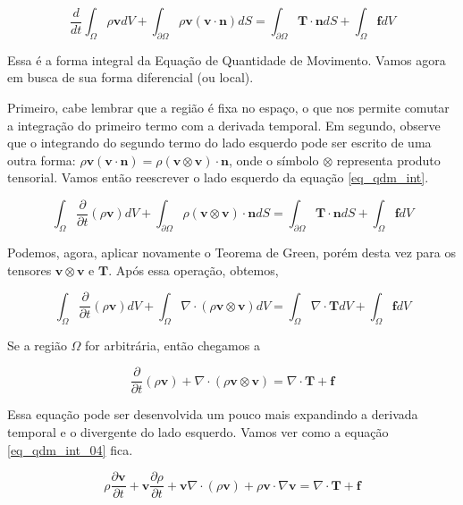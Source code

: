 \documentclass[a4paper,portuguese,10pt]{article}
\renewcommand{\div}{\nabla\cdot}
\newcommand{\grad}{\nabla}
\renewcommand{\D}{\partial}
\renewcommand{\vec}{\mathbf}
\begin{document}
\begin{equation}
  \frac{d}{dt}\int_{\Omega}\rho\vec{v}dV + \int_{\D\Omega}\rho\vec{v}(\vec{v}\cdot\vec{n})dS = \int_{\D\Omega}\vec{T}\cdot\vec{n}dS + \int_{\Omega}\vec{f}dV
  \label{eq_qdm_int}
\end{equation}

Essa é a forma integral da Equação de Quantidade de Movimento. Vamos agora em busca de sua forma diferencial (ou local).

Primeiro, cabe lembrar que a região é fixa no espaço, o que nos permite comutar a integração do primeiro termo com a derivada temporal. Em segundo, observe que o integrando do segundo termo do lado esquerdo pode ser escrito de uma outra forma: $\rho\vec{v}(\vec{v}\cdot\vec{n}) = \rho(\vec{v}\otimes\vec{v})\cdot\vec{n}$, onde o símbolo $\otimes$ representa produto tensorial. Vamos então reescrever o lado esquerdo da equação \ref{eq_qdm_int}.

\begin{equation}
  \int_{\Omega}\frac{\D}{\D t}(\rho\vec{v})dV + \int_{\D\Omega}\rho(\vec{v}\otimes\vec{v})\cdot\vec{n}dS = \int_{\D\Omega}\vec{T}\cdot\vec{n}dS + \int_{\Omega}\vec{f}dV
  \label{eq_qdm_int_02}
\end{equation}

Podemos, agora, aplicar novamente o Teorema de Green, porém desta vez para os tensores $\vec{v}\otimes\vec{v}$ e $\vec{T}$. Após essa operação, obtemos,

\begin{equation}
  \int_{\Omega}\frac{\D}{\D t}(\rho\vec{v})dV + \int_{\Omega}\div(\rho\vec{v}\otimes\vec{v})dV = \int_{\Omega}\div\vec{T}dV + \int_{\Omega}\vec{f}dV
  \label{eq_qdm_int_03}
\end{equation}

Se a região $\Omega$ for arbitrária, então chegamos a

\begin{equation}
  \frac{\D}{\D t}(\rho\vec{v}) + \div(\rho\vec{v}\otimes\vec{v}) = \div\vec{T} + \vec{f}
  \label{eq_qdm_int_04}
\end{equation}

Essa equação pode ser desenvolvida um pouco mais expandindo a derivada temporal e o divergente do lado esquerdo. Vamos ver como a equação \ref{eq_qdm_int_04} fica.

\begin{equation}
  \rho\frac{\D\vec{v}}{\D t} + \vec{v}\frac{\D\rho}{\D t} + \vec{v}\div(\rho\vec{v}) + \rho\vec{v}\cdot\grad\vec{v} = \div\vec{T} + \vec{f}
  \label{eq_qdm_int_05}
\end{equation}
\end{document}
